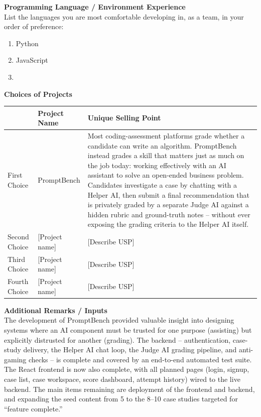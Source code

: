 \documentclass[11pt]{article}
\begin{document}
\textbf{Programming Language / Environment Experience}\\
List the languages you are most comfortable developing in, as a team, in your order of
preference:
\begin{enumerate}[nosep]
  \item Python
  \item JavaScript
  \item [Add further languages]
\end{enumerate}

\textbf{Choices of Projects}

\begin{longtable}{|p{2cm}|p{3.5cm}|p{8.3cm}|}
\hline
 & \textbf{Project Name} & \textbf{Unique Selling Point} \\
\hline
First Choice & PromptBench &
Most coding-assessment platforms grade whether a candidate can write an algorithm.
PromptBench instead grades a skill that matters just as much on the job today: working
effectively with an AI assistant to solve an open-ended business problem. Candidates
investigate a case by chatting with a Helper AI, then submit a final recommendation that is
privately graded by a separate Judge AI against a hidden rubric and ground-truth notes --
without ever exposing the grading criteria to the Helper AI itself. \\
\hline
Second Choice & [Project name] & [Describe USP] \\
\hline
Third Choice & [Project name] & [Describe USP] \\
\hline
Fourth Choice & [Project name] & [Describe USP] \\
\hline
\end{longtable}

\textbf{Additional Remarks / Inputs}\\
The development of PromptBench provided valuable insight into designing systems where an
AI component must be trusted for one purpose (assisting) but explicitly distrusted for another
(grading). The backend -- authentication, case-study delivery, the Helper AI chat loop, the
Judge AI grading pipeline, and anti-gaming checks -- is complete and covered by an
end-to-end automated test suite. The React frontend is now also complete, with all planned
pages (login, signup, case list, case workspace, score dashboard, attempt history) wired to the
live backend. The main items remaining are deployment of the frontend and backend, and
expanding the seed content from 5 to the 8--10 case studies targeted for ``feature complete.''
\end{document}
